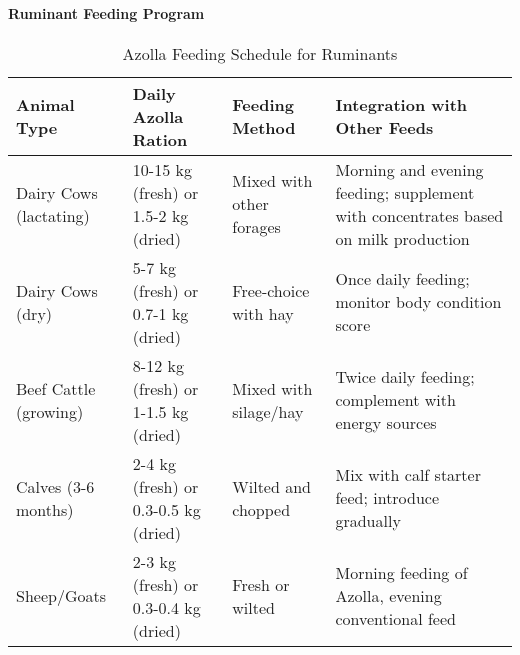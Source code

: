 \paragraph{Ruminant Feeding Program}
\begin{table}[h]
\centering
\caption{Azolla Feeding Schedule for Ruminants}
\label{tab:ruminant_feeding}
\begin{tabular}{|p{2.5cm}|p{2.5cm}|p{2.5cm}|p{4.5cm}|}
\hline
\textbf{Animal Type} & \textbf{Daily Azolla Ration} & \textbf{Feeding Method} & \textbf{Integration with Other Feeds} \\
\hline
Dairy Cows (lactating) & 10-15 kg (fresh) or 1.5-2 kg (dried) & Mixed with other forages & Morning and evening feeding; supplement with concentrates based on milk production \\
\hline
Dairy Cows (dry) & 5-7 kg (fresh) or 0.7-1 kg (dried) & Free-choice with hay & Once daily feeding; monitor body condition score \\
\hline
Beef Cattle (growing) & 8-12 kg (fresh) or 1-1.5 kg (dried) & Mixed with silage/hay & Twice daily feeding; complement with energy sources \\
\hline
Calves (3-6 months) & 2-4 kg (fresh) or 0.3-0.5 kg (dried) & Wilted and chopped & Mix with calf starter feed; introduce gradually \\
\hline
Sheep/Goats & 2-3 kg (fresh) or 0.3-0.4 kg (dried) & Fresh or wilted & Morning feeding of Azolla, evening conventional feed \\
\hline
\end{tabular}
\end{table}


